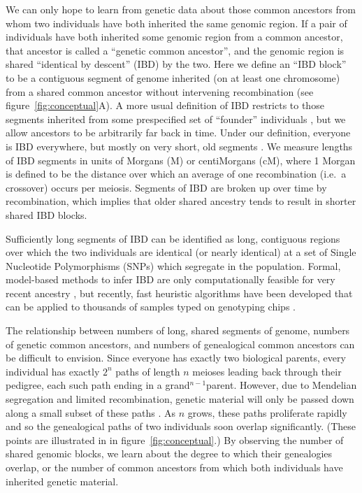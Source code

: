 \documentclass{article}
\begin{document}
We can only hope to learn from genetic data about those common ancestors from whom two individuals have both inherited the same genomic region.
If a pair of individuals have both inherited some genomic region from a common ancestor,
that ancestor is called a ``genetic common ancestor'', 
and the genomic region is shared ``identical by descent'' (IBD) by the two. 
Here we define an ``IBD block'' to be a contiguous segment of genome inherited (on at least one chromosome)
from a shared common ancestor without intervening recombination
(see figure~\ref{fig:conceptual}A).
A more usual definition of IBD 
restricts to those segments inherited from some prespecified set of ``founder'' individuals
\citep[e.g.][]{fisher1954fuller,donnelly1983probability,chapman2002effect},
but we allow ancestors to be arbitrarily far back in time.
Under our definition, everyone is IBD everywhere,
but mostly on very short, old segments \citep{powell2010reconciling}.
We measure lengths of IBD segments in units of Morgans (M) or centiMorgans (cM),
where 1 Morgan is defined to be the distance over which an average of one recombination (i.e.\ a crossover) occurs per meiosis.
Segments of IBD are broken up over time by recombination, 
which implies that older shared ancestry tends to result in shorter shared IBD blocks.

Sufficiently long segments of IBD can be identified
as long, contiguous regions over which the two individuals are identical 
(or nearly identical) at a set of Single Nucleotide Polymorphisms (SNPs) 
which segregate in the population. 
Formal, model-based methods to infer IBD are only computationally feasible 
for very recent ancestry \citep[e.g.][]{brown2012inferring},
but recently, fast heuristic algorithms have been developed
that can be applied to thousands of samples typed on genotyping chips 
\citep[e.g.][]{browning2011powerful,gusev2009whole}. 


The relationship between 
numbers of long, shared segments of genome,
numbers of genetic common ancestors,
and numbers of genealogical common ancestors
can be difficult to envision.
Since everyone has exactly two biological parents,
every individual has exactly $2^n$ paths of length $n$ meioses leading back through their pedigree,
each such path ending in a grand$^{n-1}$parent.
However, due to Mendelian segregation and limited recombination, 
genetic material will only be passed down along a small subset of
these paths \citep{donnelly1983probability}. 
As $n$ grows, these paths proliferate rapidly and so the genealogical
paths of two individuals soon overlap significantly.
(These points are illustrated in in figure~\ref{fig:conceptual}.)
By observing the number of shared genomic blocks, we learn about 
the degree to which their genealogies overlap,
or the number of common ancestors from which both individuals have inherited genetic material.
\end{document}
